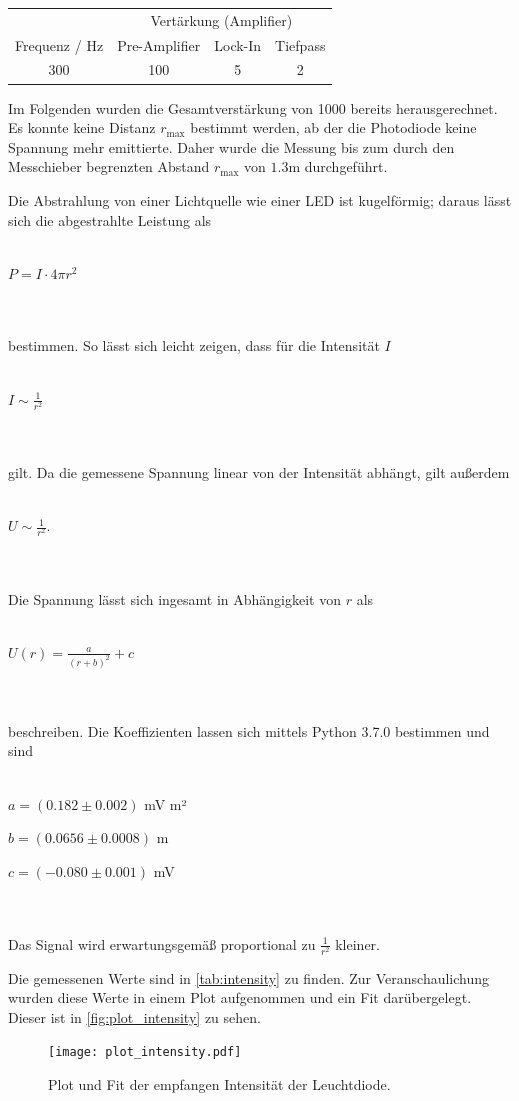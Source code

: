 \begin{table}[!htp]
  \centering
  \begin{tabular}{cccc}
    \toprule
     & \multicolumn{3}{c}{Vertärkung (Amplifier)} \\
    Frequenz / Hz & Pre-Amplifier & Lock-In & Tiefpass \\
    \midrule
    300 & 100 & 5 & 2 \\
    \bottomrule
  \end{tabular}
\end{table}

Im Folgenden wurden die Gesamtverstärkung von 1000 bereits herausgerechnet. Es konnte keine Distanz $r_\text{max}$ bestimmt werden, ab der die Photodiode keine Spannung mehr emittierte. Daher wurde die Messung bis zum durch den Messchieber begrenzten Abstand $r_\text{max}$ von $1.3$m durchgeführt.

Die Abstrahlung von einer Lichtquelle wie einer LED ist kugelförmig; daraus lässt sich die abgestrahlte Leistung als
\\ \\
\centerline{$P = I\cdot 4\pi r^2$}
\\ \\
bestimmen. So lässt sich leicht zeigen, dass für die Intensität $I$
\\ \\
\centerline{$I\sim \frac{1}{r^2}$}
\\ \\
gilt. Da die gemessene Spannung linear von der Intensität abhängt, gilt außerdem
\\ \\
\centerline{$U\sim \frac{1}{r^2}$.}
\\ \\
Die Spannung lässt sich ingesamt in Abhängigkeit von $r$ als
\\ \\
\centerline{$U(r) = \frac{a}{(r+b)^2} +c$}
\\ \\
beschreiben. Die Koeffizienten lassen sich mittels Python 3.7.0 bestimmen und sind
\\ \\
\centerline{$a=(0.182\pm 0.002)$ \!mV m²}
\centerline{$b=(0.0656\pm 0.0008)$ \!m}
\centerline{$c=(-0.080\pm 0.001)$ \!mV}
\\ \\
Das Signal wird erwartungsgemäß proportional zu $\frac{1}{r^2}$ kleiner.



Die gemessenen Werte sind in \autoref{tab:intensity} zu finden. Zur Veranschaulichung wurden diese Werte in einem Plot aufgenommen und ein Fit darübergelegt. Dieser ist in \autoref{fig:plot_intensity} zu sehen.

\begin{figure}
  \centering
  \texttt{[image: plot\_intensity.pdf]}
  \caption{Plot und Fit der empfangen Intensität der Leuchtdiode.}
  \label{fig:plot_intensity}
\end{figure}